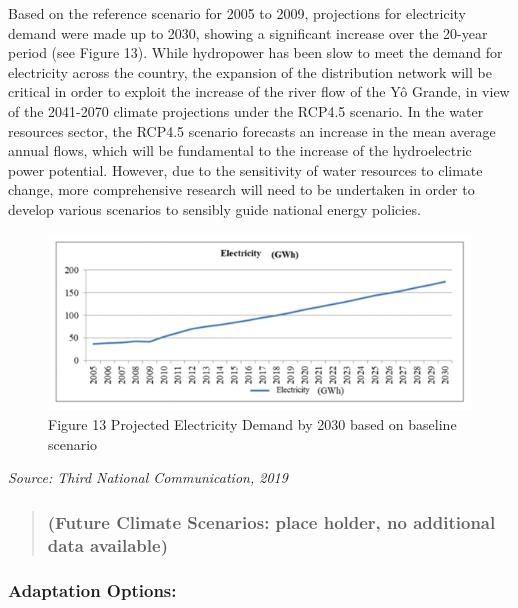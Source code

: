 \documentclass[
]{book}
\begin{document}
Based on the reference scenario for 2005 to 2009, projections for electricity demand were made up to 2030, showing a significant increase over the 20-year period (see Figure 13). While hydropower has been slow to meet the demand for electricity across the country, the expansion of the distribution network will be critical in order to exploit the increase of the river flow of the Yô Grande, in view of the 2041-2070 climate projections under the RCP4.5 scenario. In the water resources sector, the RCP4.5 scenario forecasts an increase in the mean average annual flows, which will be fundamental to the increase of the hydroelectric power potential. However, due to the sensitivity of water resources to climate change, more comprehensive research will need to be undertaken in order to develop various scenarios to sensibly guide national energy policies.

\begin{figure}
\centering
\includegraphics{images/electricity_demands.png}
\caption{Figure 13 Projected Electricity Demand by 2030 based on baseline scenario}
\end{figure}

\emph{Source: Third National Communication, 2019}

\begin{quote}
\hypertarget{future-climate-scenarios-place-holder-no-additional-data-available-1}{%
\subsubsection{(Future Climate Scenarios: place holder, no additional data available)}\label{future-climate-scenarios-place-holder-no-additional-data-available-1}}
\end{quote}

\hypertarget{adaptation-options-14}{%
\subsubsection{Adaptation Options:}\label{adaptation-options-14}}
\end{document}
